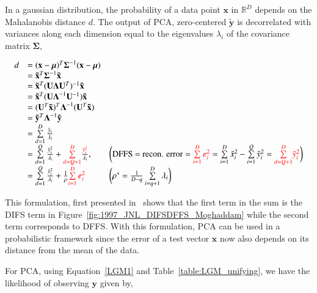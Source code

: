 In a gaussian distribution, the probability of a data point $\mathbf{x}$ in $\mathbb{R}^D$ depends on the Mahalanobis distance $d$.  The output of PCA, zero-centered $\mathbf{\tilde{y}}$ is decorrelated with variances along each dimension equal to the eigenvalues $\lambda_i$ of the covariance matrix $\boldsymbol\Sigma$,


\begin{equation}
\begin{array}{lllllll}
d &= (\mathbf{x}-\boldsymbol\mu)^T\boldsymbol\Sigma^{-1}(\mathbf{x}-\boldsymbol\mu)\\
&=\mathbf{\tilde{x}}^T\boldsymbol\Sigma^{-1}\mathbf{\tilde{x}}\\
&=\mathbf{\tilde{x}}^T(\mathbf{U}\boldsymbol\Lambda\mathbf{U}^T)^{-1}\mathbf{\tilde{x}}\\
&=\mathbf{\tilde{x}}^T(\mathbf{U}\boldsymbol\Lambda^{-1}\mathbf{U}^{-1})\mathbf{\tilde{x}}\\
&=(\mathbf{U}^T\mathbf{\tilde{x}})^T\boldsymbol\Lambda^{-1}(\mathbf{U}^T\mathbf{\tilde{x}})	\\
&=\mathbf{\tilde{y}}^T\boldsymbol\Lambda^{-1}\mathbf{\tilde{y}}\\
&=\sum\limits_{d=1}^D \frac{\tilde{y}_i}{\lambda_i}\\
&=\sum\limits_{d=1}^Q \frac{\tilde{y}_i^2}{\lambda_i} + {\color{red}\sum\limits_{d=Q+1}^D} \frac{{\color{red}\tilde{y}_i^2}}{\lambda_i}, \ \ \  & \bigg(\textrm{DFFS = recon. error}={\color{red}\sum\limits_{i=1}^D e_i^2} = \sum\limits_{i=1}^D \tilde{x}_i^2 - \sum\limits_{i=1}^Q \tilde{y}_i^2= {\color{red}\sum\limits_{d=Q+1}^D} {\color{red}\tilde{y}_i^2}\bigg)\\
&=\sum\limits_{d=1}^Q \frac{\tilde{y}_i^2}{\lambda_i} + \frac{1}{\rho} {\color{red}\sum\limits_{i=1}^D e_i^2} \ \ \ & \bigg(\rho^* = \frac{1}{D-q}\sum\limits_{i=q+1}^D \lambda_i\bigg)\\
\end{array}
\label{Eqn:MoghaddamLikelihood}
\end{equation}

This formulation, first presented in~\cite{1997_JNL_EigenTRK_Moghaddam} shows that the first term in the sum is the DIFS term in Figure~\ref{fig:1997_JNL_DIFSDFFS_Moghaddam} while the second term corresponds to DFFS.  With this formulation, PCA can be used in a probabilistic framework since the error of a test vector $\mathbf{x}$ now also depends on its distance from the mean of the data.


For PCA, using Equation~\ref{LGM1} and Table~\ref{table:LGM_unifying}, we have the likelihood of observing $\mathbf{y}$ given by,

